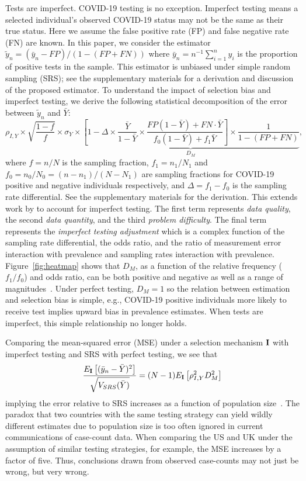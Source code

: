 \documentclass[12pt]{article}
\def\I{{\bf I}}
\begin{document}
Tests are imperfect.  COVID-19 testing is no exception.  Imperfect testing means a selected individual's observed COVID-19 status may not be the same as their true status. Here we assume the false positive rate (FP) and false negative rate (FN) are known. In this paper, we consider the estimator $\tilde y_n = (\bar y_n - FP)/(1-(FP+FN))$ where $\bar y_n = n^{-1} \sum_{i=1}^n y_i$ is the proportion of positive tests in the sample. This estimator is unbiased under simple random sampling (SRS); see the supplementary materials for a derivation and discussion of the proposed estimator. To understand the impact of selection bias and imperfect testing, we derive the following statistical decomposition of the error between $\tilde y_n$ and $\bar Y$:
\begin{equation}
\label{eq:error}
\rho_{I,Y} \times \sqrt{\frac{1-f}{f}} \times \sigma_{Y}
\times \underbrace{\left[ 1 - \Delta \times \frac{\bar Y}{1-\bar Y} \times \frac{FP(1-\bar Y) + FN \cdot \bar Y}{f_0 (1-\bar Y) + f_1 \bar Y} \right] \times \frac{1}{1-(FP+FN)}}_{D_M},
\end{equation}
where $f=n/N$ is the sampling fraction, $f_1=n_1/N_1$ and $f_0=n_0/N_0=(n-n_1)/(N-N_1)$ are sampling fractions for COVID-19 positive and negative individuals respectively, and $\Delta = f_1 - f_0$ is the sampling rate differential.  See the supplementary materials for the derivation. This extends work by \cite{Meng2018} to account for imperfect testing. The first term represents \emph{data quality}, the second \emph{data quantity}, and the third \emph{problem difficulty}.  The final term represents the \emph{imperfect testing adjustment} which is a complex function of the sampling rate differential, the odds ratio, and the ratio of measurement error interaction with prevalence and sampling rates interaction with prevalence. Figure~\ref{fig:heatmap} shows that $D_M$, as a function of the relative frequency ($f_1/f_0$) and odds ratio, can be both positive and negative as well as a range of magnitudes~\cite{Beesley2020,Beesley2019,Smeden2019}. Under perfect testing, $D_M = 1$ so the relation between estimation and selection bias is simple, e.g., COVID-19 positive individuals more likely to receive test implies upward bias in prevalence estimates. When tests are imperfect, this simple relationship no longer holds.

Comparing the mean-squared error (MSE) under a selection mechanism $\I$ with imperfect testing and SRS with perfect testing, we see that
$$
\frac{E_{\I} \left[ (\bar y_n - \bar Y)^2 \right]}{\sqrt{V_{SRS} (\bar Y)}} = (N-1) E_{\I} \left[ \rho_{I,Y}^2 D_M^2 \right]
$$
implying the error relative to SRS increases as a function of population size~\cite{Meng2018}. The paradox that two countries with the same testing strategy can yield wildly different estimates due to population size is too often ignored in current communications of case-count data.  When comparing the US and UK under the assumption of similar testing strategies, for example, the MSE increases by a factor of five.  Thus, conclusions drawn from observed case-counts may not just be wrong, but very wrong.
\end{document}
